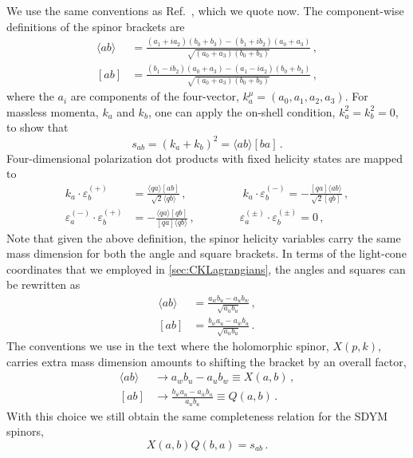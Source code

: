 \documentclass[11pt,letter]{article}
\begin{document}
We use the same conventions as Ref.~\cite{jjmcTASI2014}, which
we quote now. The component-wise definitions of the spinor brackets are
\begin{align}
\langle ab \rangle &= \frac{(a_1 + i a_2)(b_0+b_3)-(b_1 + i b_2)(a_0+a_3)}{\sqrt{(a_0+a_3)(b_0+b_3)}}\,,
\\
[ab] &= \frac{(b_1 - i b_2)(a_0+a_3)-(a_1 - i a_2)(b_0+b_3)}{\sqrt{(a_0+a_3)(b_0+b_3)}}\,,
\end{align}
where the $a_i$ are components of the four-vector,
$k^\mu_a = (a_0,a_1,a_2,a_3)$. For massless momenta, $k_a$ and $k_b$,
one can apply the on-shell condition, $k_a^2=k_b^2=0$, to show that
\begin{equation}
s_{ab} = (k_a+k_b)^2= \langle ab \rangle[ba]\,.
\end{equation}
Four-dimensional polarization dot products with fixed helicity states
are mapped to
\begin{equation}\label{eq:4DPols}
\begin{aligned}
k_a \cdot \varepsilon_b^{(+)} &= \frac{\langle q a \rangle[ab]}{\sqrt{2}\langle q b\rangle}\,,
\qquad\quad \qquad
k_a \cdot \varepsilon_b^{(-)} = -\frac{[qa]\langle ab\rangle}{\sqrt{2}[qb]}\,,
\\
\varepsilon_a^{(-)}\cdot \varepsilon_b^{(+)} &= - \frac{\langle q a\rangle [qb]}{ [qa]\langle q b\rangle} \,,
\qquad \qquad
\varepsilon_a^{(\pm)}\cdot \varepsilon_b^{(\pm)} = 0 \,,
\end{aligned}
\end{equation}
Note that given the above definition, the spinor helicity variables
carry the same mass dimension for both the angle and square
brackets. In terms of the light-cone coordinates that we employed in
\cref{sec:CKLagrangians}, the angles and squares can be rewritten as
\begin{align}
\langle ab \rangle &= \frac{a_w b_u-a_u b_w}{\sqrt{a_ub_u}}\,,
\\
[ab] &= \frac{b_{\bar{w}}a_u-a_{\bar{w}}b_u}{\sqrt{a_ub_u}}\,.
\end{align}
The conventions we use in the text where the holomorphic spinor,
$X(p,k)$, carries extra mass dimension amounts to shifting
the bracket by an overall factor,
\begin{align}
\langle ab \rangle &\rightarrow a_w b_u-a_u b_w \equiv X(a,b)\,,
\\
[ab] &\rightarrow \frac{b_{\bar{w}}a_u-a_{\bar{w}}b_u}{a_ub_u}\equiv Q(a,b)\, .
\end{align}
With this choice we still obtain the same completeness relation for the SDYM spinors,
\begin{equation}
X(a,b)Q(b,a) = s_{ab}\, .
\end{equation}
\end{document}
